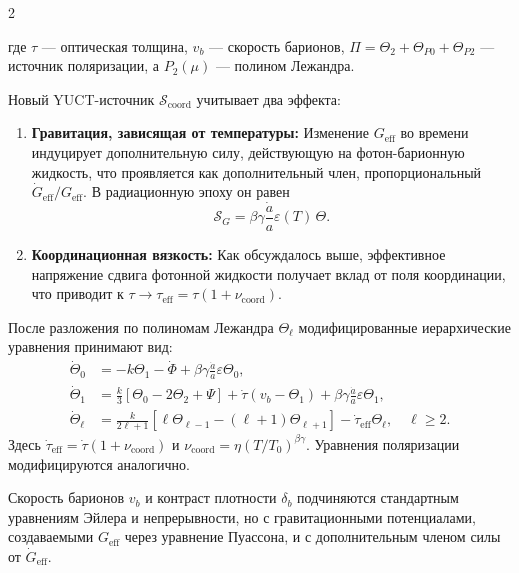 \documentclass[11pt,a4paper]{article}
\begin{document}
	\begin{multicols}{2}
		
		\noindent где $\tau$ — оптическая толщина, $v_b$ — скорость барионов, $\Pi = \Theta_2 + \Theta_{P0} + \Theta_{P2}$ — источник поляризации, а $P_2(\mu)$ — полином Лежандра.
		
		Новый YUCT-источник $\mathcal{S}_{\mathrm{coord}}$ учитывает два эффекта:
		\begin{enumerate}
			\item \textbf{Гравитация, зависящая от температуры:} Изменение $G_{\mathrm{eff}}$ во времени индуцирует дополнительную силу, действующую на фотон-барионную жидкость, что проявляется как дополнительный член, пропорциональный $\dot{G}_{\mathrm{eff}}/G_{\mathrm{eff}}$. В радиационную эпоху он равен
			\begin{equation}
				\mathcal{S}_G = \beta\gamma \frac{\dot{a}}{a} \varepsilon(T) \, \Theta.
			\end{equation}
			\item \textbf{Координационная вязкость:} Как обсуждалось выше, эффективное напряжение сдвига фотонной жидкости получает вклад от поля координации, что приводит к $\tau \to \tau_{\mathrm{eff}} = \tau (1 + \nu_{\mathrm{coord}})$.
		\end{enumerate}
		
		После разложения по полиномам Лежандра $\Theta_\ell$ модифицированные иерархические уравнения принимают вид:
		\begin{align}
			\dot{\Theta}_0 &= -k\Theta_1 - \dot{\Phi} + \beta\gamma \frac{\dot{a}}{a} \varepsilon \Theta_0, \label{eq:hier0}\\
			\dot{\Theta}_1 &= \frac{k}{3}\left[\Theta_0 - 2\Theta_2 + \Psi\right] + \dot{\tau}(v_b - \Theta_1) + \beta\gamma \frac{\dot{a}}{a} \varepsilon \Theta_1, \label{eq:hier1}\\
			\dot{\Theta}_\ell &= \frac{k}{2\ell+1}\left[\ell\Theta_{\ell-1} - (\ell+1)\Theta_{\ell+1}\right] - \dot{\tau}_{\mathrm{eff}}\Theta_\ell, \quad \ell \ge 2. \label{eq:hier_ell}
		\end{align}
		Здесь $\dot{\tau}_{\mathrm{eff}} = \dot{\tau}(1 + \nu_{\mathrm{coord}})$ и $\nu_{\mathrm{coord}} = \eta (T/T_0)^{\beta\gamma}$. Уравнения поляризации модифицируются аналогично.
		
		Скорость барионов $v_b$ и контраст плотности $\delta_b$ подчиняются стандартным уравнениям Эйлера и непрерывности, но с гравитационными потенциалами, создаваемыми $G_{\mathrm{eff}}$ через уравнение Пуассона, и с дополнительным членом силы от $\dot{G}_{\mathrm{eff}}$.
		

\end{multicols}
\end{document}
